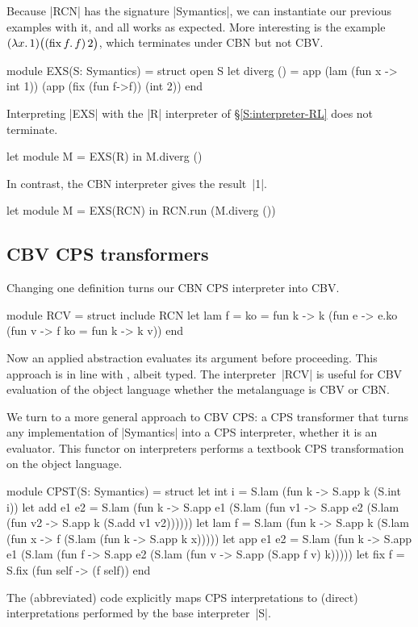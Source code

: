 \documentclass[preprint]{sigplanconf}
\newcommand{\fun}[1]{\mathopen{\lambda\mathord{#1}.\,}}
\newcommand{\fix}[1]{\mathopen{\mathrm{fix\,}\mathord{#1}.\,}}
\begin{document}
Because |RCN| has the signature |Symantics|, we can instantiate our previous
examples with it, and all works as expected.  More interesting
is the example $(\fun{x}1)\bigl((\fix{f}f)\mathinner2\bigr)$, which terminates
under CBN but not CBV\@.
\begin{code}
module EXS(S: Symantics) = struct open S
 let diverg () = app (lam (fun x -> int 1)) 
                  (app (fix (fun f->f)) (int 2))
end
\end{code}
Interpreting |EXS| with the |R| interpreter of
\S\ref{S:interpreter-RL} does not terminate.
\begin{code}
let module M = EXS(R) in M.diverg ()
\end{code}
In contrast, the CBN interpreter gives the result~|1|.
\begin{code}
let module M = EXS(RCN) in RCN.run (M.diverg ())
\end{code}

\subsection{CBV CPS transformers}

Changing one definition turns our CBN CPS interpreter into CBV\@.
\begin{code}
module RCV = struct include RCN
  let lam f = {ko = fun k -> k (fun e ->
    e.ko (fun v -> f {ko = fun k -> k v}))}
end
\end{code}
Now an applied abstraction
evaluates its argument before proceeding. This approach is in
line with , albeit typed. The
interpreter~|RCV| is useful for CBV evaluation of the object language
whether the metalanguage is CBV or CBN\@.

We turn to a more general approach to CBV CPS: a CPS transformer that
turns any implementation of |Symantics| into a CPS interpreter, whether
it is an evaluator.  This functor on interpreters performs a textbook
CPS transformation on the object language.
\begin{code}
module CPST(S: Symantics) = struct
  let int i = S.lam (fun k -> S.app k (S.int i))
  let add e1 e2 = S.lam (fun k ->
    S.app e1 (S.lam (fun v1 ->
    S.app e2 (S.lam (fun v2 ->
    S.app k (S.add v1 v2))))))
  let lam f = S.lam (fun k -> S.app k (S.lam
    (fun x -> f (S.lam (fun k -> S.app k x)))))
  let app e1 e2 = S.lam (fun k -> 
    S.app e1 (S.lam (fun f ->
    S.app e2 (S.lam (fun v ->
    S.app (S.app f v) k)))))
  let fix f = S.fix (fun self -> (f self))
end
\end{code}
The (abbreviated) code explicitly maps CPS interpretations to
(direct) interpretations performed by 
the base interpreter~|S|.
\end{document}
